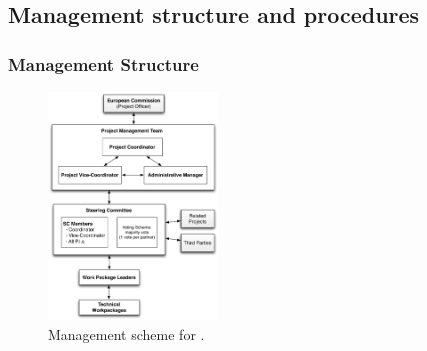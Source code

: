 

\subsection{Management structure and procedures}
\label{sec:management}

%
%
%   
%

\subsubsection{Management Structure}

\begin{figure}%
    \includegraphics[width=0.4\textwidth]{pics/mngt2}
    \caption{Management scheme for \Project.}
    \label{fig:management}
\end{figure}

